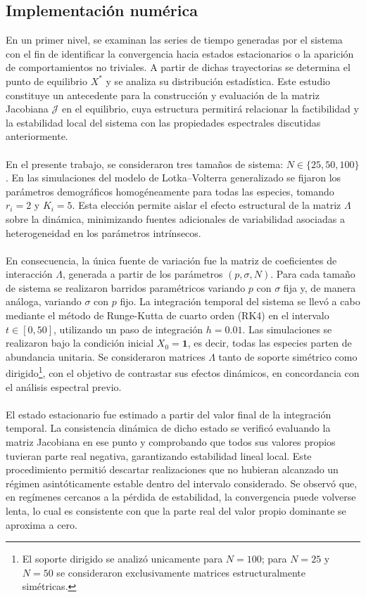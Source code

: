 \subsection{Implementación numérica}

En un primer nivel, se examinan las series de tiempo generadas por el sistema con el fin de identificar la convergencia hacia estados estacionarios o la aparición de comportamientos no triviales. A partir de dichas trayectorias se determina el punto de equilibrio $X^*$ y se analiza su distribución estadística. Este estudio constituye un antecedente para la construcción y evaluación de la matriz Jacobiana $\mathcal{J}$ en el equilibrio, cuya estructura permitirá relacionar la factibilidad y la estabilidad local del sistema con las propiedades espectrales discutidas anteriormente.
\\
\\
En el presente trabajo, se consideraron tres tamaños de sistema: $N\in\{25,50,100\}$. En las simulaciones del modelo de Lotka--Volterra generalizado se fijaron los parámetros demográficos homogéneamente para todas las especies, tomando $r_i=2$ y $K_i=5$. Esta elección permite aislar el efecto estructural de la matriz $\Lambda$ sobre la dinámica, minimizando fuentes adicionales de variabilidad asociadas a heterogeneidad en los parámetros intrínsecos. \\
\\
En consecuencia, la única fuente de variación fue la matriz de coeficientes de interacción $\Lambda$, generada a partir de los parámetros $(p,\sigma,N)$. Para cada tamaño de sistema se realizaron barridos paramétricos variando $p$ con $\sigma$ fija y, de manera análoga, variando $\sigma$ con $p$ fijo. La integración temporal del sistema se llevó a cabo mediante el método de Runge-Kutta de cuarto orden (RK4) en el intervalo $t\in[0,50]$, utilizando un paso de integración $h=0.01$. Las simulaciones se realizaron bajo la condición inicial $X_0=\textbf{1}$, es decir, todas las especies parten de abundancia unitaria. Se consideraron matrices $\Lambda$ tanto de soporte simétrico como dirigido\footnote{El soporte dirigido se analizó unicamente para $N=100$; para $N=25$ y $N=50$ se consideraron exclusivamente matrices estructuralmente simétricas.}, con el objetivo de contrastar sus efectos dinámicos, en concordancia con el análisis espectral previo. \\
\\
El estado estacionario fue estimado a partir del valor final de la integración temporal. La consistencia dinámica de dicho estado se verificó evaluando la matriz Jacobiana en ese punto y comprobando que todos sus valores propios tuvieran parte real negativa, garantizando estabilidad lineal local. Este procedimiento permitió descartar realizaciones que no hubieran alcanzado un régimen asintóticamente estable dentro del intervalo considerado. Se observó que, en regímenes cercanos a la pérdida de estabilidad, la convergencia puede volverse lenta, lo cual es consistente con que la parte real del valor propio dominante se aproxima a cero.



